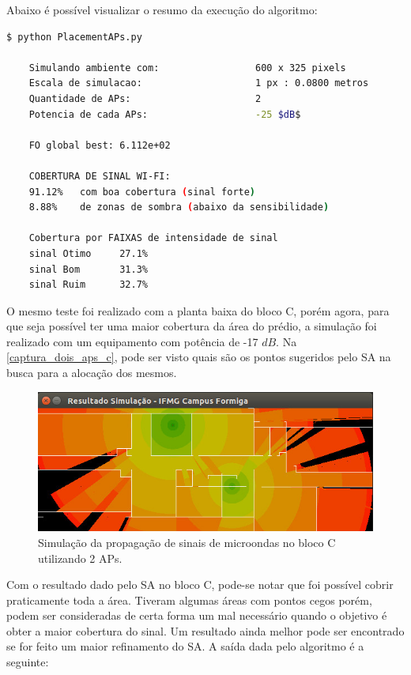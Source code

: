 \documentclass[
	12pt,				%
	twoside,			%
	a4paper,			%
	english,			%
	french,				%
	spanish,			%
	brazil				%
	]{abntex2}
\begin{document}
Abaixo é possível visualizar o resumo da execução do algoritmo:

\begin{lstlisting}[language=bash]
    $ python PlacementAPs.py 
    
    Simulando ambiente com:                 600 x 325 pixels
    Escala de simulacao:                    1 px : 0.0800 metros
    Quantidade de APs:                      2
    Potencia de cada APs:                   -25 $dB$
    
    FO global best: 6.112e+02
    
    COBERTURA DE SINAL WI-FI:
    91.12%   com boa cobertura (sinal forte)
    8.88%    de zonas de sombra (abaixo da sensibilidade)
    
    Cobertura por FAIXAS de intensidade de sinal
    sinal Otimo     27.1%
    sinal Bom       31.3%
    sinal Ruim      32.7%
\end{lstlisting}

O mesmo teste foi realizado com a planta baixa do bloco C, porém agora,
para que seja possível ter uma maior cobertura da área do prédio, a
simulação foi realizado com um equipamento com potência de -17 \(dB\).
Na \autoref{captura_dois_aps_c}, pode ser visto quais são os pontos
sugeridos pelo SA na busca para a alocação dos mesmos.

\begin{figure}[ht]
    \caption{\label{captura_dois_aps_c} Simulação da propagação de sinais de microondas no bloco C utilizando 2 APs.
    }
    \begin{center}
        \includegraphics[scale=0.7]{imagens/captura-2-aps-bloco-c-2.jpg}
    \end{center}
\end{figure}

Com o resultado dado pelo SA no bloco C, pode-se notar que foi possível
cobrir praticamente toda a área. Tiveram algumas áreas com pontos cegos
porém, podem ser consideradas de certa forma um mal necessário quando o
objetivo é obter a maior cobertura do sinal. Um resultado ainda melhor
pode ser encontrado se for feito um maior refinamento do SA. A saída
dada pelo algoritmo é a seguinte:
\end{document}
